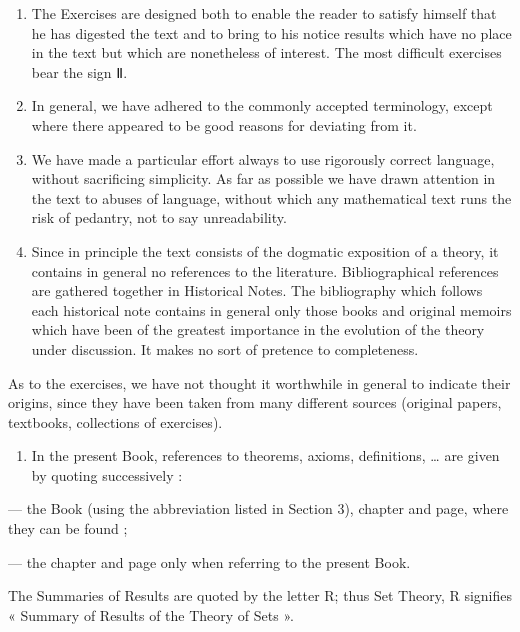 \begin{enumerate}
\def\labelenumi{\arabic{enumi}.}
\setcounter{enumi}{6}
\item
  The Exercises are designed both to enable the reader to satisfy himself that he has digested the text and to bring to his notice results which have no place in the text but which are nonetheless of interest. The most difficult exercises bear the sign Ⅱ.
\item
  In general, we have adhered to the commonly accepted terminology, except where there appeared to be good reasons for deviating from it.
\item
  We have made a particular effort always to use rigorously correct language, without sacrificing simplicity. As far as possible we have drawn attention in the text to abuses of language, without which any mathematical text runs the risk of pedantry, not to say unreadability.
\item
  Since in principle the text consists of the dogmatic exposition of a theory, it contains in general no references to the literature. Bibliographical references are gathered together in Historical Notes. The bibliography which follows each historical note contains in general only those books and original memoirs which have been of the greatest importance in the evolution of the theory under discussion. It makes no sort of pretence to completeness.
\end{enumerate}

As to the exercises, we have not thought it worthwhile in general to indicate their origins, since they have been taken from many different sources (original papers, textbooks, collections of exercises).

\begin{enumerate}
\def\labelenumi{\arabic{enumi}.}
\setcounter{enumi}{10}
\tightlist
\item
  In the present Book, references to theorems, axioms, definitions, \ldots{} are given by quoting successively :
\end{enumerate}

--- the Book (using the abbreviation listed in Section 3), chapter and page, where they can be found ;

--- the chapter and page only when referring to the present Book.

The Summaries of Results are quoted by the letter R; thus Set Theory, R signifies « Summary of Results of the Theory of Sets ».

